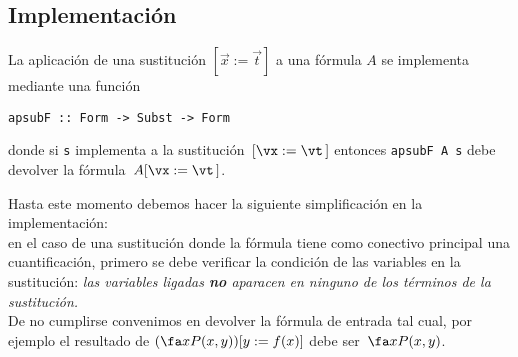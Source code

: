 \documentclass[11pt,letterpaper]{article}
\begin{document}

\subsection{Implementación}
La aplicación de una sustitución $[\vec{x}:=\vec{t}]$ a una fórmula $A$ se 
implementa mediante una función
\begin{verbatim}
apsubF :: Form -> Subst -> Form
\end{verbatim}
donde si \verb-s- implementa a la sustitución~$[\vx:=\vt\,]$ entonces 
\verb-apsubF A s- debe devolver la fórmula~$A[\vx:=\vt\,]$. 

\vspace*{10pt}

\noindent Hasta este momento debemos hacer la siguiente simplificación en la 
implementación: \\
en el caso de una sustitución donde la fórmula tiene como conectivo 
principal una cuantificación, primero se debe verificar la condición de las 
variables en la sustitución: \textit{las variables ligadas \textbf{no} 
aparacen en ninguno de los términos de la sustitución.}\\
De no cumplirse convenimos en devolver la fórmula de entrada tal cual, por 
ejemplo el resultado de $(\fa x P(x,y))[y:=f(x)]$ debe ser~$\fa x P(x,y)$.

\end{document}
